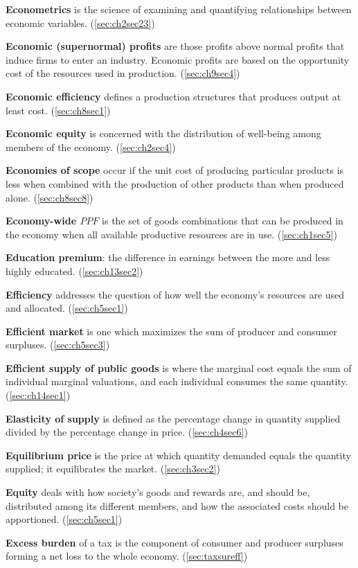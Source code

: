 \textbf{Econometrics} is the science of examining and quantifying relationships between economic variables. (\ref{sec:ch2sec23})

\textbf{Economic (supernormal) profits} are those profits above normal profits that induce firms to enter an industry. Economic profits are based on the opportunity cost of the resources used in production. (\ref{sec:ch9sec4})

\textbf{Economic efficiency} defines a production structures that produces output at least cost. (\ref{sec:ch8sec1})

\textbf{Economic equity} is concerned with the distribution of well-being among members of the economy. (\ref{sec:ch2sec4})

\textbf{Economies of scope} occur if the unit cost of producing particular products is less when combined with the production of other products than when produced alone. (\ref{sec:ch8sec8})

\textbf{Economy-wide $PPF$} is the set of goods combinations that can be produced in the economy when all available productive resources are in use. (\ref{sec:ch1sec5})

\textbf{Education premium}: the difference in earnings between the more and less highly educated. (\ref{sec:ch13sec2})

\textbf{Efficiency} addresses the question of how well the economy's resources are used and allocated. (\ref{sec:ch5sec1})

\textbf{Efficient market} is one which maximizes the sum of producer and consumer surpluses. (\ref{sec:ch5sec3})

\textbf{Efficient supply of public goods} is where the marginal cost equals the sum of individual marginal valuations, and each individual consumes the same quantity. (\ref{sec:ch14sec1})

\textbf{Elasticity of supply} is defined as the percentage change in quantity supplied divided by the percentage change in price. (\ref{sec:ch4sec6})

\textbf{Equilibrium price} is the price at which quantity demanded equals the quantity supplied; it equilibrates the market. (\ref{sec:ch3sec2})

\textbf{Equity} deals with how society's goods and rewards are, and should be, distributed among its different members, and how the associated costs should be apportioned. (\ref{sec:ch5sec1})

\textbf{Excess burden} of a tax is the component of consumer and producer surpluses forming a net loss to the whole economy. (\ref{sec:taxsureff})

